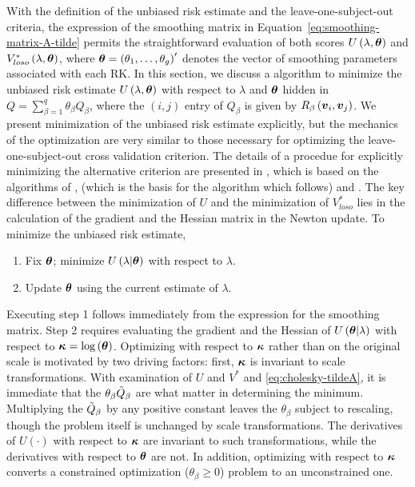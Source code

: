 With the definition of the unbiased risk estimate and the leave-one-subject-out criteria, the expression of the smoothing matrix in Equation~\ref{eq:smoothing-matrix-A-tilde} permits the straightforward evaluation of both scores $U\left(\lambda, \mbox{\boldmath $\theta$} \right)$ and $V_{loso}^*\left(\lambda, \mbox{\boldmath $\theta$} \right)$, where $\mbox{\boldmath $\theta$} = \left(\theta_1,\dots, \theta_g\right)'$ denotes the vector of smoothing parameters associated with each RK.  In this section, we discuss a algorithm to minimize the unbiased risk estimate $U\left(\lambda, \mbox{\boldmath $\theta$}\right)$ with respect to $\lambda$ and $\mbox{\boldmath $\theta$}$ hidden in $Q = \sum_{\beta = 1}^q \theta_\beta Q_\beta$, where the $\left(i,j\right)$ entry of $Q_\beta$ is given by $R_\beta\left(\mbox{\boldmath $v$}_i,\mbox{\boldmath $v$}_j\right)$.  We present minimization of the unbiased risk estimate explicitly, but the mechanics of the optimization are very similar to those necessary for optimizing the leave-one-subject-out cross validation criterion. The details of a procedue for explicitly minimizing the alternative criterion are presented in \cite{xu2012asymptotic}, which is based on the algorithms of \cite{gu1991minimizing}, \cite{kim2004smoothing} (which is the basis for the algorithm which follows) and \cite{wood2004stable}. The key difference between the minimization of $U$ and the minimization of $V^*_{loso}$ lies in the calculation of the gradient and the Hessian matrix in the Newton update. To minimize the unbiased risk estimate,

\begin{enumerate}
\item Fix $\mbox{\boldmath $\theta$}$; minimize $U\left(\lambda \vert \mbox{\boldmath $\theta$}\right)$ with respect to $\lambda$.
\item Update $\mbox{\boldmath $\theta$}$ using the current estimate of $\lambda$.
\end{enumerate}
\noindent
Executing step 1 follows immediately from the expression for the smoothing matrix. Step 2 requires evaluating the gradient and the Hessian of $U\left( \mbox{\boldmath $\theta$} \vert \lambda \right)$ with respect to $\mbox{\boldmath $\kappa$} = \log\left(\mbox{\boldmath $\theta$}\right)$. Optimizing with respect to $\mbox{\boldmath $\kappa$}$ rather than on the original scale is motivated by two driving factors: first, $\mbox{\boldmath $\kappa$}$ is invariant to scale transformations. With examination of $U$ and $V^*$ and \ref{eq:cholesky-tildeA}, it is immediate that the $\theta_\beta \tilde{Q}_\beta$ are what matter in determining the minimum. Multiplying the $\tilde{Q}_\beta$ by any positive constant leaves the $\theta_\beta$ subject to rescaling, though the problem itself is unchanged by scale transformations. The derivatives of $U\left(\cdot\right)$ with respect to $\mbox{\boldmath $\kappa$}$ are invariant to such transformations, while the derivatives with respect to $\mbox{\boldmath $\theta$}$ are not. In addition, optimizing with respect to $\mbox{\boldmath $\kappa$}$ converts a constrained optimization ($\theta_\beta \ge 0$) problem to an unconstrained one.

